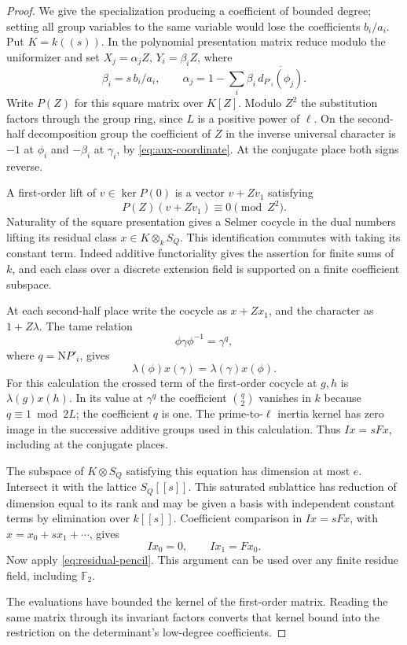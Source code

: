\begin{proof}
We give the specialization producing a coefficient of bounded
degree; setting all group variables to the same variable would
lose the coefficients \(b_i/a_i\). Put \(K=k((s))\).
In the polynomial presentation matrix reduce modulo the
uniformizer and set \(X_j=\alpha_j Z\), \(Y_i=\beta_i Z\),
where
\[
  \beta_i=s\, b_i/a_i,\qquad
  \alpha_j=1-\sum_i\beta_i\,\overline{d_{P'_i}(\phi_j)} .
\]
Write \(P(Z)\) for this square matrix over \(K[Z]\).
Modulo \(Z^2\) the substitution factors through the group ring,
since \(L\) is a positive power of \(\ell\). On the second-half
decomposition group the coefficient of \(Z\) in the inverse
universal character is \(-1\) at \(\phi_i\) and \(-\beta_i\)
at \(\gamma_i\), by \eqref{eq:aux-coordinate}. At the
conjugate place both signs reverse.

A first-order lift of \(v\in\ker P(0)\) is a vector \(v+Zv_1\) satisfying
\[
 P(Z)(v+Zv_1)\equiv0\pmod{Z^2}.
\]
Naturality of the square presentation gives
a Selmer cocycle in the dual numbers lifting its residual
class \(x\in K\otimes_k S_Q\). This identification commutes
with taking its constant term. Indeed additive functoriality
gives the assertion for finite sums of \(k\), and each class
over a discrete extension field is supported on a finite
coefficient subspace.

At each second-half place write the
cocycle as \(x+Zx_1\), and the character as \(1+Z\lambda\).
The tame relation
\[
 \phi\gamma\phi^{-1}=\gamma^q,
\]
where
\(q=\mathrm NP'_i\), gives
\[
             \lambda(\phi)x(\gamma)=\lambda(\gamma)x(\phi).
\]
For this calculation the crossed term of the first-order
cocycle at \(g,h\) is \(\lambda(g)x(h)\). In its value at
\(\gamma^q\) the coefficient \(\binom q2\) vanishes in \(k\)
because \(q\equiv1\bmod 2L\); the coefficient \(q\) is one.
The prime-to-\(\ell\) inertia kernel has zero image in the
successive additive groups used in this calculation.
Thus \(Ix=sFx\), including at the conjugate places.

The subspace of \(K\otimes S_Q\) satisfying this equation
has dimension at most \(e\). Intersect it with the lattice
\(S_Q[[s]]\). This saturated sublattice has reduction of
dimension equal to its rank and may be given a basis with
independent constant terms by elimination over \(k[[s]]\).
Coefficient comparison in \(Ix=sFx\), with \(x=x_0+sx_1+\cdots\), gives
\[
 Ix_0=0,\qquad Ix_1=Fx_0.
\]
Now apply
\eqref{eq:residual-pencil}. This argument can be used over
any finite residue field, including \(\mathbb F_2\).

The evaluations have bounded the kernel of the first-order matrix. Reading the same matrix through its invariant factors converts that kernel bound into the restriction on the determinant's low-degree coefficients.


\end{proof}
